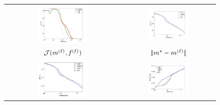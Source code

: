 \begin{figure}[ht]
\begin{center}
\begin{tabular}{cc}
\includegraphics[trim=25 5 45 20,clip,width=0.45\textwidth]{images/J}&\hspace{-0.15cm}
\includegraphics[trim=25 5 45 20,clip,width=0.45\textwidth]{images/M}\vspace{0.1cm}\\
$\mathcal{J}( {m}^{(\ell)}, {f}^{(\ell)} )$&\hspace{-0.15cm}$|\!| m^\star-{m}^{(\ell)} |\!|$\\
\includegraphics[trim=25 5 45 20,clip,width=0.45\textwidth]{images/F}&\hspace{-0.15cm}
\includegraphics[trim=30 5 45 20,clip,width=0.45\textwidth]{images/Minvalue}\vspace{0.1cm}\\

\end{tabular}
\end{center}
\end{figure}

